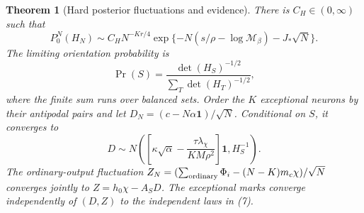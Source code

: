 \documentclass[11pt]{article}
\newtheorem{theorem}{Theorem}\newtheorem{lemma}[theorem]{Lemma}
\newcommand{\one}{\mathbf1}\newcommand{\TV}{\mathrm{TV}}
\begin{document}
\begin{theorem}[Hard posterior fluctuations and evidence]\label{thm:hard}
There is $C_H\in(0,\infty)$ such that
\[
 P_0^N(H_N)\sim C_H N^{-Kr/4}
   \exp\{-N(s/\rho-\log\mathcal M_\beta)-J_*\sqrt N\}.  \tag{15}
\]
The limiting orientation probability is
\[
               \Pr(S)=\frac{\det(H_S)^{-1/2}}
                         {\sum_T\det(H_T)^{-1/2}},       \tag{16}
\]
where the finite sum runs over balanced sets.
Order the $K$ exceptional neurons by their antipodal pairs and let
$D_N=(c-N\alpha\one)/\sqrt N$. Conditional on $S$, it converges to
\[
 D\sim N\left(\left[\kappa\sqrt\alpha-
                \frac{\tau\lambda_\chi}{KM\rho^2}\right]\one,
                                      H_S^{-1}\right).  \tag{17}
\]
The ordinary-output fluctuation
$Z_N=(\sum_{\rm ordinary}\Phi_i-(N-K)m_c\chi)/\sqrt N$
converges jointly to $Z=h_0\chi-A_SD$. The exceptional marks converge
independently of $(D,Z)$ to the independent laws in (7).
\end{theorem}
\end{document}
